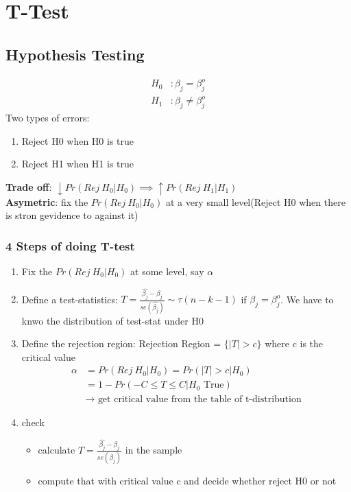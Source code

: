 \documentclass{article}
\theoremstyle{definition}
\theoremstyle{thrm}
\theoremstyle{lma}
\theoremstyle{ppst}
\theoremstyle{crlr}
\begin{document}
\section{T-Test}
\subsection{Hypothesis Testing}
\begin{align*}
	H_0&: \beta_j = \beta_j^o\\
	H_1&: \beta_j\neq \beta_j^o
\end{align*}
Two types of errors:
\begin{enumerate}
	\item Reject H0 when H0 is true
	\item Reject H1 when H1 is true
\end{enumerate}
\textbf{Trade off}: $\downarrow Pr(Rej\ H_0|H_0)\implies \uparrow Pr(Rej \ H_1|H_1)$\\
\textbf{Asymetric}: fix the $Pr(Rej\ H_0|H_0)$ at a very small level(Reject H0 when there is stron gevidence to against it)
\subsubsection{4 Steps of doing T-test}
\begin{enumerate}
	\item Fix the $Pr(Rej\ H_0|H_0)$ at some level, say $\alpha$
	\item Define a test-statistics: $T = \frac{\hat{\beta_j}-\beta_j}{se(\hat{\beta_j})}\sim \tau(n-k-1)$ if $\beta_j = \beta_j^o$. We have to knwo the distribution of test-stat under H0
	\item Define the rejection region: Rejection Region  = $\{|T|>c\}$ where c is the critical value\begin{align*}
		\alpha &= Pr(Rej\ H_0|H_0) = Pr(|T|>c|H_0)\\
		&= 1- Pr(-C\leq T\leq C|H_0 \text{ True})\\
		&\to \text{ get critical value from the table of t-distribution}
	\end{align*}
	\item check\begin{itemize}
		\item calculate $T = \frac{\hat{\beta_j}-\beta_j}{se(\hat{\beta_j})}$ in the sample
		\item compute that with critical value c and decide whether reject H0 or not
	\end{itemize}
\end{enumerate}
\end{document}
